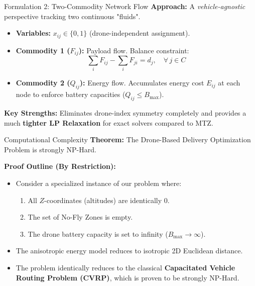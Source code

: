 \documentclass[11pt,aspectratio=169]{beamer}
\begin{document}
\begin{frame}{Formulation 2: Two-Commodity Network Flow}
    \textbf{Approach:} A \emph{vehicle-agnostic} perspective tracking two continuous "fluids".
    
    \begin{itemize}
        \item \textbf{Variables:} $x_{ij} \in \{0, 1\}$ (drone-independent assignment).
        \item \textbf{Commodity 1 ($F_{ij}$):} Payload flow. Balance constraint:
        \begin{equation*}
            \sum_{i} F_{ij} - \sum_{i} F_{ji} = d_j, \quad \forall\, j \in C
        \end{equation*}
        \item \textbf{Commodity 2 ($Q_{ij}$):} Energy flow. Accumulates energy cost $E_{ij}$ at each node to enforce battery capacities ($Q_{ij} \le B_{\max}$).
    \end{itemize}

    \vspace{0.1cm}
    \textbf{Key Strengths:} Eliminates drone-index symmetry completely and provides a much \textbf{tighter LP Relaxation} for exact solvers compared to MTZ.
\end{frame}

\begin{frame}{Computational Complexity}
    \textbf{Theorem:} The Drone-Based Delivery Optimization Problem is strongly NP-Hard.
    
    \vspace{0.5cm}
    \textbf{Proof Outline (By Restriction):}
    \begin{itemize}
        \item Consider a specialized instance of our problem where:
        \begin{enumerate}
            \item All $Z$-coordinates (altitudes) are identically 0.
            \item The set of No-Fly Zones is empty.
            \item The drone battery capacity is set to infinity ($B_{\max} \to \infty$).
        \end{enumerate}
        \item The anisotropic energy model reduces to isotropic 2D Euclidean distance.
        \item The problem identically reduces to the classical \textbf{Capacitated Vehicle Routing Problem (CVRP)}, which is proven to be strongly NP-Hard.
    \end{itemize}
\end{frame}
\end{document}
